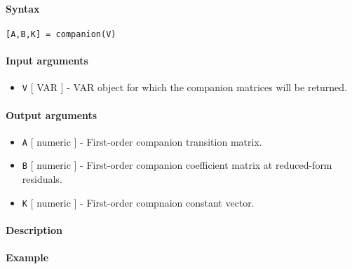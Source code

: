 


	\paragraph{Syntax}\label{syntax}

\begin{verbatim}
[A,B,K] = companion(V)
\end{verbatim}

\paragraph{Input arguments}\label{input-arguments}

\begin{itemize}
\itemsep1pt\parskip0pt
\item
  \texttt{V} {[} VAR {]} - VAR object for which the companion matrices
  will be returned.
\end{itemize}

\paragraph{Output arguments}\label{output-arguments}

\begin{itemize}
\item
  \texttt{A} {[} numeric {]} - First-order companion transition matrix.
\item
  \texttt{B} {[} numeric {]} - First-order companion coefficient matrix
  at reduced-form residuals.
\item
  \texttt{K} {[} numeric {]} - First-order compnaion constant vector.
\end{itemize}

\paragraph{Description}\label{description}

\paragraph{Example}\label{example}



